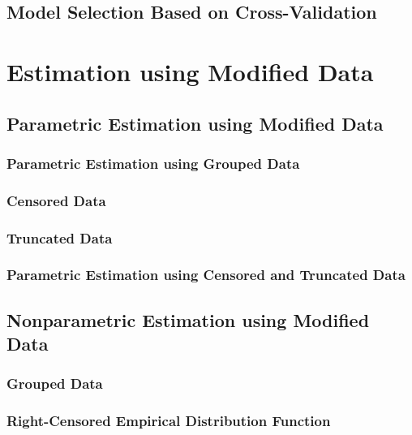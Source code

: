 \documentclass[]{book}
\theoremstyle{definition}
\theoremstyle{definition}
\theoremstyle{definition}
\theoremstyle{remark}
\begin{document}
\subsection{Model Selection Based on
Cross-Validation}\label{model-selection-based-on-cross-validation}

\section{Estimation using Modified Data}\label{S:MS:ModifiedData}

\subsection{Parametric Estimation using Modified
Data}\label{parametric-estimation-using-modified-data}

\subsubsection{Parametric Estimation using Grouped
Data}\label{S:MS:GroupedData}

\subsubsection{Censored Data}\label{censored-data}

\subsubsection{Truncated Data}\label{truncated-data}

\subsubsection{Parametric Estimation using Censored and Truncated
Data}\label{parametric-estimation-using-censored-and-truncated-data}

\subsection{Nonparametric Estimation using Modified
Data}\label{nonparametric-estimation-using-modified-data}

\subsubsection{Grouped Data}\label{grouped-data}

\subsubsection{Right-Censored Empirical Distribution
Function}\label{right-censored-empirical-distribution-function}
\end{document}
